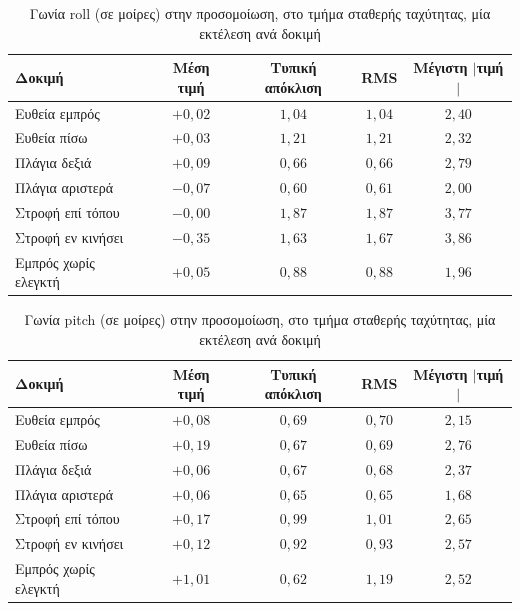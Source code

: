 \begin{table}[htbp]
    \centering
    \small
    \begin{tabular}{@{}l c c c c@{}}
        \toprule
        Δοκιμή & Μέση τιμή & Τυπική απόκλιση & RMS & Μέγιστη $|$τιμή$|$ \\
        \midrule
        Ευθεία εμπρός & $+0{,}02$ & $1{,}04$ & $1{,}04$ & $2{,}40$ \\
        Ευθεία πίσω & $+0{,}03$ & $1{,}21$ & $1{,}21$ & $2{,}32$ \\
        Πλάγια δεξιά & $+0{,}09$ & $0{,}66$ & $0{,}66$ & $2{,}79$ \\
        Πλάγια αριστερά & $-0{,}07$ & $0{,}60$ & $0{,}61$ & $2{,}00$ \\
        Στροφή επί τόπου & $-0{,}00$ & $1{,}87$ & $1{,}87$ & $3{,}77$ \\
        Στροφή εν κινήσει & $-0{,}35$ & $1{,}63$ & $1{,}67$ & $3{,}86$ \\
        Εμπρός χωρίς ελεγκτή & $+0{,}05$ & $0{,}88$ & $0{,}88$ & $1{,}96$ \\
        \bottomrule
    \end{tabular}
    \caption[Γωνία roll στην προσομοίωση]{Γωνία roll (σε μοίρες) στην προσομοίωση, στο τμήμα σταθερής ταχύτητας, μία εκτέλεση ανά δοκιμή}
    \label{tab:sim-roll}
\end{table}

\begin{table}[htbp]
    \centering
    \small
    \begin{tabular}{@{}l c c c c@{}}
        \toprule
        Δοκιμή & Μέση τιμή & Τυπική απόκλιση & RMS & Μέγιστη $|$τιμή$|$ \\
        \midrule
        Ευθεία εμπρός & $+0{,}08$ & $0{,}69$ & $0{,}70$ & $2{,}15$ \\
        Ευθεία πίσω & $+0{,}19$ & $0{,}67$ & $0{,}69$ & $2{,}76$ \\
        Πλάγια δεξιά & $+0{,}06$ & $0{,}67$ & $0{,}68$ & $2{,}37$ \\
        Πλάγια αριστερά & $+0{,}06$ & $0{,}65$ & $0{,}65$ & $1{,}68$ \\
        Στροφή επί τόπου & $+0{,}17$ & $0{,}99$ & $1{,}01$ & $2{,}65$ \\
        Στροφή εν κινήσει & $+0{,}12$ & $0{,}92$ & $0{,}93$ & $2{,}57$ \\
        Εμπρός χωρίς ελεγκτή & $+1{,}01$ & $0{,}62$ & $1{,}19$ & $2{,}52$ \\
        \bottomrule
    \end{tabular}
    \caption[Γωνία pitch στην προσομοίωση]{Γωνία pitch (σε μοίρες) στην προσομοίωση, στο τμήμα σταθερής ταχύτητας, μία εκτέλεση ανά δοκιμή}
    \label{tab:sim-pitch}
\end{table}

